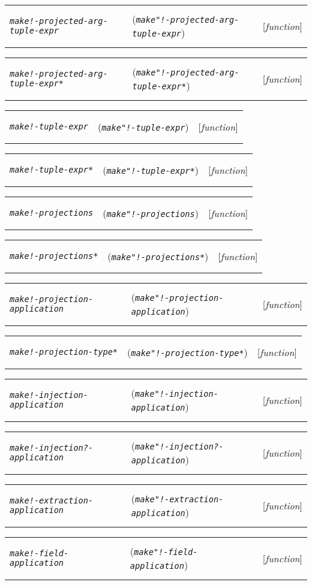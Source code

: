 \documentclass[12pt]{book}
\makeatletter
\def\amprest{{\smaller\sc {\smaller\smaller \&}rest\ }}
\newcommand{\functionnm}[1]{\texttt{\textit{#1}}}
\newenvironment{functioni}[3]%
{\par\noindent\begin{boxedminipage}{\textwidth}%
 \par\noindent\begin{tabularx}{\linewidth}{lXr}%
 \hypertarget{#1}{\functionnm{#1}}\index{#2@\functionnm{#2}|underline}%
   &(\texttt{\textit{#2}})&[\emph{function}]%
 \end{tabularx}\par}
{\end{boxedminipage}}
\makeatother
\begin{document}
\begin{functioni}{make!-projected-arg-tuple-expr}{make"!-projected-arg-tuple-expr}{\amprest args}
\end{functioni}

\begin{functioni}{make!-projected-arg-tuple-expr*}{make"!-projected-arg-tuple-expr*}{args}
\end{functioni}

\begin{functioni}{make!-tuple-expr}{make"!-tuple-expr}{\amprest exprs}
\end{functioni}

\begin{functioni}{make!-tuple-expr*}{make"!-tuple-expr*}{exprs}
\end{functioni}

\begin{functioni}{make!-projections}{make"!-projections}{expr}
\end{functioni}

\begin{functioni}{make!-projections*}{make"!-projections*}{types arg index projapps}
\end{functioni}

\begin{functioni}{make!-projection-application}{make"!-projection-application}{index arg}
\end{functioni}

\begin{functioni}{make!-projection-type*}{make"!-projection-type*}{types index ctr arg}
\end{functioni}

\begin{functioni}{make!-injection-application}{make"!-injection-application}{index arg type}
\end{functioni}

\begin{functioni}{make!-injection?-application}{make"!-injection?-application}{index arg}
\end{functioni}

\begin{functioni}{make!-extraction-application}{make"!-extraction-application}{index arg}
\end{functioni}

\begin{functioni}{make!-field-application}{make"!-field-application}{field-name arg}
\end{functioni}
\end{document}
